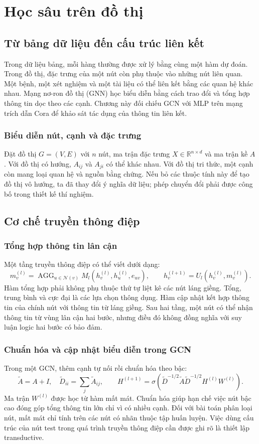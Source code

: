 \chapter{Học sâu trên đồ thị}
\section{Từ bảng dữ liệu đến cấu trúc liên kết}
Trong dữ liệu bảng, mỗi hàng thường được xử lý bằng cùng một hàm dự đoán. Trong đồ thị, đặc trưng của một nút còn phụ thuộc vào những nút liên quan. Một bệnh, một xét nghiệm và một tài liệu có thể liên kết bằng các quan hệ khác nhau. Mạng nơ-ron đồ thị (GNN) học biểu diễn bằng cách trao đổi và tổng hợp thông tin dọc theo các cạnh. Chương này đối chiếu GCN với MLP trên mạng trích dẫn Cora để khảo sát tác dụng của thông tin liên kết.

\subsection{Biểu diễn nút, cạnh và đặc trưng}
Đặt đồ thị $G=(V,E)$ với $n$ nút, ma trận đặc trưng $X\in\mathbb{R}^{n\times d}$ và ma trận kề $A$. Với đồ thị có hướng, $A_{ij}$ và $A_{ji}$ có thể khác nhau. Với đồ thị tri thức, một cạnh còn mang loại quan hệ và nguồn bằng chứng. Nếu bỏ các thuộc tính này để tạo đồ thị vô hướng, ta đã thay đổi ý nghĩa dữ liệu; phép chuyển đổi phải được công bố trong thiết kế thí nghiệm.
\section{Cơ chế truyền thông điệp}
\subsection{Tổng hợp thông tin lân cận}
Một tầng truyền thông điệp có thể viết dưới dạng:
\[
m_v^{(l)}=\operatorname{AGG}_{u\in\mathcal{N}(v)} M_l(h_v^{(l)},h_u^{(l)},e_{uv}),\qquad
h_v^{(l+1)}=U_l(h_v^{(l)},m_v^{(l)}).
\]
Hàm tổng hợp phải không phụ thuộc thứ tự liệt kê các nút láng giềng. Tổng, trung bình và cực đại là các lựa chọn thông dụng. Hàm cập nhật kết hợp thông tin của chính nút với thông tin từ láng giềng. Sau hai tầng, một nút có thể nhận thông tin từ vùng lân cận hai bước, nhưng điều đó không đồng nghĩa với suy luận logic hai bước có bảo đảm.

\subsection{Chuẩn hóa và cập nhật biểu diễn trong GCN}
Trong một GCN, thêm cạnh tự nối rồi chuẩn hóa theo bậc:
\[
\widetilde A=A+I,\quad \widetilde D_{ii}=\sum_j\widetilde A_{ij},\qquad
H^{(l+1)}=\sigma(\widetilde D^{-1/2}\widetilde A\widetilde D^{-1/2}H^{(l)}W^{(l)}).
\]
Ma trận $W^{(l)}$ được học từ hàm mất mát. Chuẩn hóa giúp hạn chế việc nút bậc cao đóng góp tổng thông tin lớn chỉ vì có nhiều cạnh. Đối với bài toán phân loại nút, mất mát chỉ tính trên các nút có nhãn thuộc tập huấn luyện. Việc dùng cấu trúc của nút test trong quá trình truyền thông điệp cần được ghi rõ là thiết lập transductive.
